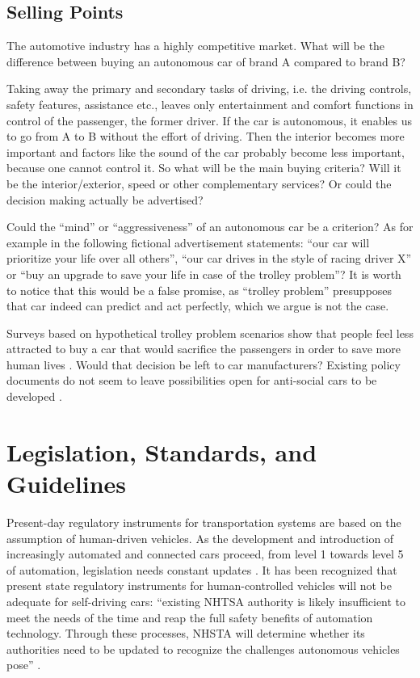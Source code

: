 \subsection{Selling Points}
\label{sec:EAofNONTC:SellingPoints}

The automotive industry has a highly competitive market. What will be the difference between buying an autonomous car of brand A compared to brand B? 

Taking away the primary and secondary tasks of driving, i.e. the driving controls, safety features, assistance etc., leaves only entertainment and comfort functions in control of the passenger, the former driver. If the car is autonomous, it enables us to go from A to B without the effort of driving. Then the interior becomes more important and factors like the sound of the car probably become less important, because one cannot control it. So what will be the main buying criteria? Will it be the interior/exterior, speed or other complementary services? Or could the decision making actually be advertised? 

Could the \enquote{mind} or \enquote{aggressiveness} of an autonomous car be a criterion? As for example in the following fictional advertisement statements: \enquote{our car will prioritize your life over all others}, \enquote{our car drives in the style of racing driver X} or \enquote{buy an upgrade to save your life in case of the trolley problem}? It is worth to notice that this would be a false promise, as \enquote{trolley problem} presupposes that car indeed can predict and act perfectly, which we argue is not the case.

Surveys based on hypothetical trolley problem scenarios show that people feel less attracted to buy a car that would sacrifice the passengers in order to save more human lives \cite{Bonnefon2016}. Would that decision be left to car manufacturers? Existing policy documents do not seem to leave possibilities open for anti-social cars to be developed \cite{EthicsCommission2017pr,EthicsCommission2017b,Pillath2016,NHTSA2016PolicyUpdate,DBLP:journals/corr/CharisiDFLMSSWY17} .


\section{Legislation, Standards, and Guidelines}
\label{sec:LegislationStandardGuidelines}

Present-day regulatory instruments for transportation systems are based on the assumption of human-driven vehicles. As the development and introduction of increasingly automated and connected cars proceed, from level 1 towards level 5 of automation, legislation needs constant updates \cite{EthicsCommission2017pr,EthicsCommission2017b,Pillath2016,NHTSA2016PolicyUpdate}. It has been recognized that present state regulatory instruments for human-controlled vehicles will not be adequate for self-driving cars:  \enquote{existing NHTSA authority is likely insufficient to meet the needs of the time and reap the full safety benefits of automation technology. Through these processes, NHSTA will determine whether its authorities need to be updated to recognize the challenges autonomous vehicles pose} \cite{NHTSA2016PolicyUpdate}.

